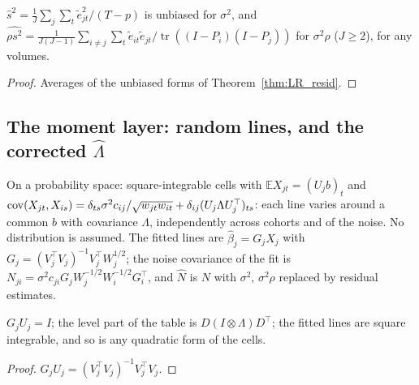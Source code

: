 \begin{theorem}\label{thm:LR_pool}
  \leanok
  $\hat s^2 = \frac1J\sum_j\sum_t\tilde e_{jt}^2/(T - p)$ is unbiased for $\sigma^2$, and
  $\widehat{\rho s^2} = \frac{1}{J(J-1)}\sum_{i \ne j}\sum_t\tilde e_{it}\tilde e_{jt}/
  \operatorname{tr}((I - P_i)(I - P_j))$ for $\sigma^2\rho$ ($J \ge 2$), for any volumes.
\end{theorem}
\begin{proof}
  \leanok
  Averages of the unbiased forms of Theorem~\ref{thm:LR_resid}.
\end{proof}

\subsection*{The moment layer: random lines, and the corrected $\hat\Lambda$}

\begin{definition}\label{def:LRM_data}
  \leanok
  On a probability space: square-integrable cells with $\mathbb EX_{jt} = (U_jb)_t$ and
  $\operatorname{cov}(X_{jt}, X_{is}) = \delta_{ts}\sigma^2c_{ij}/\sqrt{w_{jt}w_{it}} + \delta_{ij}(U_j\Lambda U_j^\top)_{ts}$:
  each line varies around a common $b$ with covariance $\Lambda$, independently across cohorts
  and of the noise. No distribution is assumed. The fitted lines are $\hat\beta_j = G_jX_j$ with
  $G_j = (V_j^\top V_j)^{-1}V_j^\top W_j^{1/2}$; the noise covariance of the fit is
  $N_{ji} = \sigma^2c_{ji}G_jW_j^{-1/2}W_i^{-1/2}G_i^\top$, and $\hat N$ is $N$ with
  $\sigma^2$, $\sigma^2\rho$ replaced by residual estimates.
\end{definition}

\begin{lemma}\label{lem:LRM_basic}
  \leanok
  $G_jU_j = I$; the level part of the table is $D(I \otimes \Lambda)D^\top$; the fitted lines are
  square integrable, and so is any quadratic form of the cells.
\end{lemma}
\begin{proof}
  \leanok
  $G_jU_j = (V_j^\top V_j)^{-1}V_j^\top V_j$.
\end{proof}

